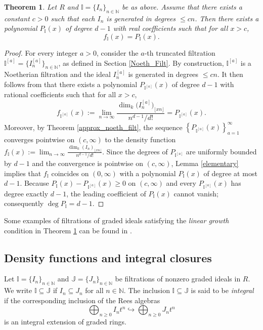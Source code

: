 \documentclass[12pt,a4paper]{amsart}
\theoremstyle{plain}
\newtheorem{theorem}{Theorem}[section]
\theoremstyle{definition}
\numberwithin{equation}{theorem}
\begin{document}
\begin{theorem}\label{even_linear}
Let $R$ and $\mathbb{I}=\{I_n\}_{n\in\mathbb{N}}$ be as above. Assume that there exists a constant $c>0$ such that each $I_n$ is generated in degrees $\leq cn$. Then there exists a polynomial $P_{\mathbb{I}}(x)$ of degree $d-1$ with real coefficients such that for all $x>c$, $$f_{\mathbb{I}}(x) = P_{\mathbb{I}}(x).$$
\end{theorem}
\begin{proof}
For every integer $a>0$, consider the $a$-th truncated filtration $\mathbb{I}^{[a]} = \big\{I^{[a]}_n\big\}_{n\in\mathbb{N}}$, as defined in Section \ref{Noeth_Filt}. By construction, $\mathbb{I}^{[a]}$ is a Noetherian filtration and the ideal $I^{[a]}_n$ is generated in degrees $\leq cn$. It then follows from \cite[Theorem 4.4]{DRT25} that there exists a polynomial $P_{\mathbb{I}^{[a]}}(x)$ of degree $d-1$ with rational coefficients such that for all $x>c$, $$f_{\mathbb{I}^{[a]}}(x) := \lim_{n\to\infty}\dfrac{\dim_k {\big(I^{[a]}_n\big)}_{\lfloor xn \rfloor}}{n^{d-1}/d!} = P_{\mathbb{I}^{[a]}}(x).$$ Moreover, by Theorem \ref{approx_noeth_filt}, the sequence $\left\{P_{\mathbb{I}^{[a]}}(x)\right\}_{a=1}^{\infty}$ converges pointwise on $(c,\infty)$ to the density function $f_{\mathbb{I}}(x):=\lim_{n\to\infty}\frac{\dim_k {\left(I_n\right)}_{\lfloor xn \rfloor}}{n^{d-1}/d!}$. Since the degrees of $P_{\mathbb{I}^{[a]}}$ are uniformly bounded by $d-1$ and the convergence is pointwise on $(c,\infty)$, Lemma \ref{elementary} implies that $f_{\mathbb{I}}$ coincides on $(0,\infty)$ with a polynomial $P_{\mathbb{I}}(x)$ of degree at most $d-1$. Because $P_{\mathbb{I}}(x) - P_{\mathbb{I}^{[a]}}(x) \geq 0$ on $(c,\infty)$ and every $P_{\mathbb{I}^{[a]}}(x)$ has degree exactly $d-1$, the leading coefficient of $P_{\mathbb{I}}(x)$ cannot vanish; consequently $\deg P_{\mathbb{I}} = d-1$.
\end{proof}

Some examples of filtrations of graded ideals satisfying the \emph{linear growth} condition in Theorem \ref{even_linear} can be found in \cite{HHT02}.

\subsection{Density functions and integral closures}
Let $\mathbb{I}=\{I_n\}_{n\in\mathbb{N}}$ and $\mathbb{J}=\{J_n\}_{n\in\mathbb{N}}$ be filtrations of nonzero graded ideals in $R$. We write $\mathbb{I} \subseteq \mathbb{J}$ if $I_n \subseteq J_n$ for all $n \in \mathbb{N}$. The inclusion $\mathbb{I} \subseteq \mathbb{J}$ is said to be \emph{integral} if the corresponding inclusion of the Rees algebras $$\bigoplus_{n\geq 0}I_nt^n \hookrightarrow \bigoplus_{n\geq 0}J_nt^n$$ is an integral extension of graded rings.
\end{document}
